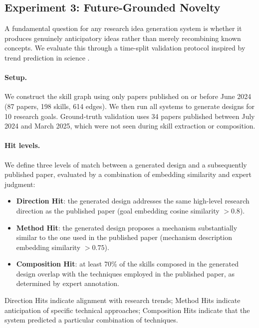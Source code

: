 \subsection{Experiment 3: Future-Grounded Novelty}
\label{subsec:future_grounded}

A fundamental question for any research idea generation system is whether it produces genuinely anticipatory ideas rather than merely recombining known concepts. We evaluate this through a time-split validation protocol inspired by trend prediction in science \cite{krenn2022predicting}.

\paragraph{Setup.}
We construct the skill graph using only papers published on or before June 2024 (87 papers, 198 skills, 614 edges). We then run all systems to generate designs for 10 research goals. Ground-truth validation uses 34 papers published between July 2024 and March 2025, which were not seen during skill extraction or composition.

\paragraph{Hit levels.}
We define three levels of match between a generated design and a subsequently published paper, evaluated by a combination of embedding similarity and expert judgment:
\begin{itemize}[leftmargin=1.5em]
    \item \textbf{Direction Hit}: the generated design addresses the same high-level research direction as the published paper (goal embedding cosine similarity $> 0.8$).
    \item \textbf{Method Hit}: the generated design proposes a mechanism substantially similar to the one used in the published paper (mechanism description embedding similarity $> 0.75$).
    \item \textbf{Composition Hit}: at least 70\% of the skills composed in the generated design overlap with the techniques employed in the published paper, as determined by expert annotation.
\end{itemize}

\noindent Direction Hits indicate alignment with research trends; Method Hits indicate anticipation of specific technical approaches; Composition Hits indicate that the system predicted a particular combination of techniques.

